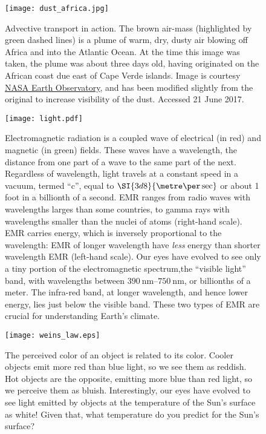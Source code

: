 \begin{figure}[p]
\centering
\texttt{[image: dust\_africa.jpg]}%
\caption{Advective transport in action. The brown air-mass (highlighted by green dashed lines) is a plume of warm, dry, dusty air blowing off Africa and into the Atlantic Ocean. At the time this image was taken, the plume was about three days old, having originated on the African coast due east of Cape Verde islands. Image is courtesy \href{https://earthobservatory.nasa.gov/IOTD/view.php?id=85423}{NASA Earth Observatory}, and has been modified slightly from the original to increase visibility of the dust. Accessed 21 June 2017.}
\label{fig:dust_africa}
\end{figure}

\begin{figure}[p]
\centering
\texttt{[image: light.pdf]}%
\caption{Electromagnetic radiation is a coupled wave of electrical (in red) and magnetic (in green) fields. These waves have a wavelength, the distance from one part of a wave to the same part of the next.  Regardless of wavelength, light travels at a constant speed in a vacuum, termed ``c'', equal to $\SI{3d8}{\metre\per\sec}$ or about 1 foot in a billionth of a second. EMR ranges from radio waves with wavelengths larges than some countries, to gamma rays with wavelengths smaller than the nuclei of atoms (right-hand scale). EMR carries energy, which is inversely proportional to the wavelength: EMR of longer wavelength have \emph{less} energy than shorter wavelength EMR (left-hand scale). Our eyes have evolved to see only a tiny portion of the electromagnetic spectrum,the ``visible light'' band, with wavelengths between $\SIrange{390}{750}{\nano\metre}$, or billionths of a meter. The infra-red band, at longer wavelength, and hence lower energy, lies just below the visible band. These two types of EMR are crucial for understanding Earth's climate.}
\label{fig:light}
\end{figure}


\begin{figure}[p]
\centering
\texttt{[image: weins\_law.eps]}%
\caption{The perceived color of an object is related to its color. Cooler objects emit more red than blue light, so we see them as reddish. Hot objects are the opposite, emitting more blue than red light, so we perceive them as bluish. Interestingly, our eyes have evolved to see light emitted by objects at the temperature of the Sun's surface as white! Given that, what temperature do you predict for the Sun's surface?}
\label{fig:weins_law}
\end{figure}

